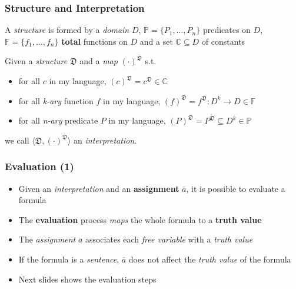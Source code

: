 \documentclass{beamer}
\begin{document}
                \begin{frame}
                    \frametitle{Structure and Interpretation}
                    \begin{definition}[Structure]
                        A \textit{structure} is formed by a \textit{domain} $ D $, $\mathbb{P} = \{ P_1, \dots, P_n \} $ predicates on $ D $, $ \mathbb{F} = \{ f_1, \dots, f_n \} $ \textbf{total} functions on $ D $ and a set $ \mathbb{C} \subseteq D $ of constants
                    \end{definition}
                    \begin{definition}[Interpretation]
                        Given a \textit{structure} $ \mathfrak{D} $ and a \textit{map} $ (\cdot)^{\mathfrak{D}} $ s.t.
                        \begin{itemize}
                            \item for all $ c $ in my language, $ (c)^\mathfrak{D} = c^\mathfrak{D} \in \mathbb{C} $
                            \item for all \textit{k-ary} function $ f $ in my language, $ (f)^\mathfrak{D} = f^\mathfrak{D}: D^k \to D \in \mathbb{F} $
                            \item for all \textit{n-ary} predicate $ P $ in my language, $ (P)^\mathfrak{D} = P^\mathfrak{D} \subseteq D^k \in \mathbb{P} $
                        \end{itemize}
                        we call $ \langle \mathfrak{D}, (\cdot)^{\mathfrak{D}} \rangle $ an \textit{interpretation}.
                    \end{definition}

                \end{frame}

                \begin{frame}
                    \frametitle{Evaluation (1)}
                    \begin{itemize}
                        \item Given an \textit{interpretation} and an \textbf{assignment} $ \overline{a} $, it is possible to evaluate a formula
                        \item The \textbf{evaluation} process \textit{maps} the whole formula to a \textbf{truth value}
                        \item The \textit{assignment} $ \overline{a} $ associates each \textit{free variable} with a \textit{truth value}
                        \item If the formula is a \textit{sentence}, $ \overline{a} $ does not affect the \textit{truth value} of the formula
                        \item Next slides shows the evaluation steps   
                    \end{itemize}
                \end{frame}
\end{document}
